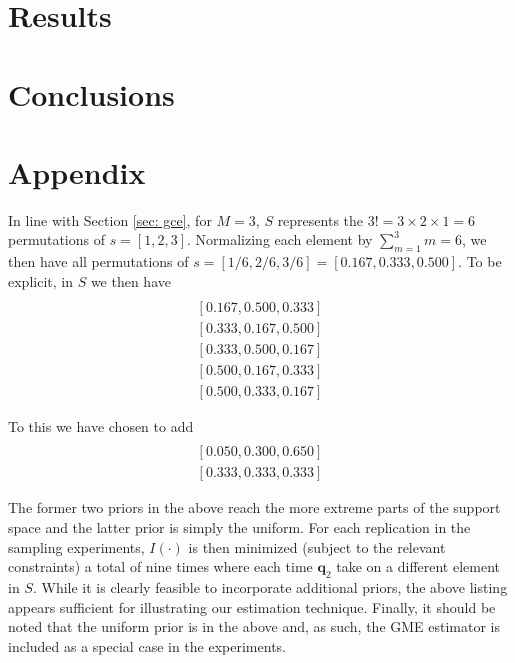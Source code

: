 \documentclass[english]{article}
\begin{document}

\section{Results}
\label{sec: results}


\section{Conclusions}
\label{sec: conc}


\newpage
\section*{Appendix}
\label{sec: appendix}

In line with Section \ref{sec: gce}, for $M=3$, $S$ represents the $3! = 3 
\times 2 \times 1 = 6$ permutations of $s = [1, 2, 3]$. 
Normalizing each element by $\sum_{m=1}^{3} m = 6$, we then have all 
permutations of $s = [1/6, 2/6, 3/6] = [0.167, 0.333, 0.500]$.
To be explicit, in $S$ we then have
\begin{align*}
[0.167, 0.333, 0.500] \\
[0.167, 0.500, 0.333] \\
[0.333, 0.167, 0.500] \\
[0.333, 0.500, 0.167] \\
[0.500, 0.167, 0.333] \\
[0.500, 0.333, 0.167] 
\end{align*}

\noindent
To this we have chosen to add
\begin{align*}
[0.650, 0.300, 0.050] \\
[0.050, 0.300, 0.650] \\
[0.333, 0.333, 0.333]
\end{align*}

\noindent
The former two priors in the above reach the more extreme parts of the 
support space and the latter prior is simply the uniform.
For each replication in the sampling experiments, $I(\cdot)$ is then 
minimized (subject to the relevant constraints) a total of nine times where
each time $\mathbf{q}_2$ take on a different element in $S$. 
While it is clearly feasible to incorporate additional priors, the above listing 
appears sufficient for illustrating our estimation technique.
Finally, it should be noted that the uniform prior is in the above 
and, as such, the GME estimator is included as a special case in the 
experiments. 
\end{document}
